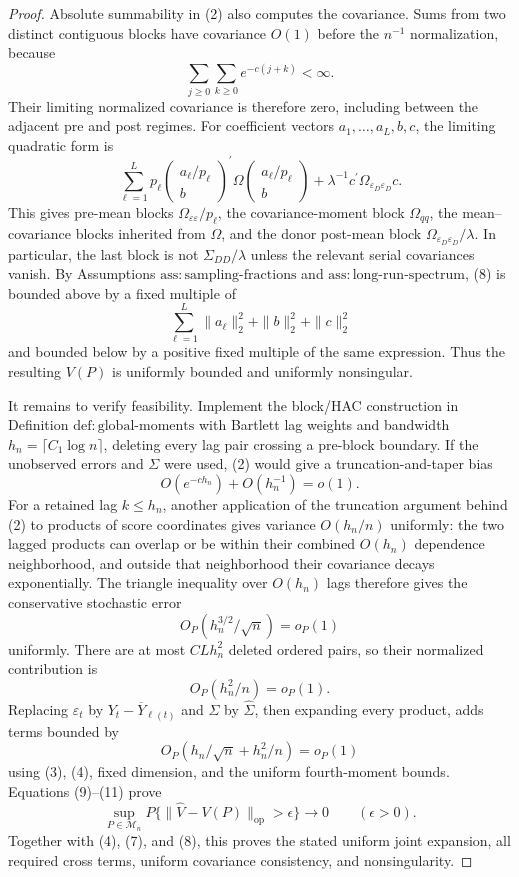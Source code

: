 \documentclass{article}
\begin{document}
\begin{proof}
Absolute summability in (2) also computes the covariance.  Sums from two distinct contiguous blocks have covariance \(O(1)\) before the \(n^{-1}\) normalization, because
\[
\sum_{j\geq0}\sum_{k\geq0}e^{-c(j+k)}<\infty.
\]
Their limiting normalized covariance is therefore zero, including between the adjacent pre and post regimes.  For coefficient vectors \(a_1,\ldots,a_L,b,c\), the limiting quadratic form is
\[
\sum_{\ell=1}^{L}p_\ell
\begin{pmatrix}a_\ell/p_\ell\\ b\end{pmatrix}^{\!\prime}
\Omega
\begin{pmatrix}a_\ell/p_\ell\\ b\end{pmatrix}
+\lambda^{-1}c^{\prime}
\Omega_{\varepsilon_D\varepsilon_D}c.
\tag{8}
\]
This gives pre-mean blocks \(\Omega_{\varepsilon\varepsilon}/p_\ell\), the covariance-moment block \(\Omega_{qq}\), the mean--covariance blocks inherited from \(\Omega\), and the donor post-mean block \(\Omega_{\varepsilon_D\varepsilon_D}/\lambda\).  In particular, the last block is not \(\Sigma_{DD}/\lambda\) unless the relevant serial covariances vanish.  By Assumptions \(\mathrm{ass:sampling\mbox{-}fractions}\) and \(\mathrm{ass:long\mbox{-}run\mbox{-}spectrum}\), (8) is bounded above by a fixed multiple of
\[
\sum_{\ell=1}^{L}\|a_\ell\|_2^2+\|b\|_2^2+\|c\|_2^2
\]
and bounded below by a positive fixed multiple of the same expression.  Thus the resulting \(V(P)\) is uniformly bounded and uniformly nonsingular.

It remains to verify feasibility.  Implement the block/HAC construction in Definition \(\mathrm{def:global\mbox{-}moments}\) with Bartlett lag weights and bandwidth \(h_n=\lceil C_1\log n\rceil\), deleting every lag pair crossing a pre-block boundary.  If the unobserved errors and \(\Sigma\) were used, (2) would give a truncation-and-taper bias
\[
O(e^{-ch_n})+O(h_n^{-1})=o(1).
\]
For a retained lag \(k\leq h_n\), another application of the truncation argument behind (2) to products of score coordinates gives variance \(O(h_n/n)\) uniformly: the two lagged products can overlap or be within their combined \(O(h_n)\) dependence neighborhood, and outside that neighborhood their covariance decays exponentially.  The triangle inequality over \(O(h_n)\) lags therefore gives the conservative stochastic error
\[
O_P(h_n^{3/2}/\sqrt n)=o_P(1)
\tag{9}
\]
uniformly.  There are at most \(C Lh_n^2\) deleted ordered pairs, so their normalized contribution is
\[
O_P(h_n^2/n)=o_P(1).
\tag{10}
\]
Replacing \(\varepsilon_t\) by \(Y_t-\overline Y_{\ell(t)}\) and \(\Sigma\) by \(\widehat\Sigma\), then expanding every product, adds terms bounded by
\[
O_P(h_n/\sqrt n+h_n^2/n)=o_P(1)
\tag{11}
\]
using (3), (4), fixed dimension, and the uniform fourth-moment bounds.  Equations (9)--(11) prove
\[
\sup_{P\in\mathcal M_n}
P\{\|\widehat V-V(P)\|_{\mathrm{op}}>\epsilon\}
\longrightarrow0
\qquad(\epsilon>0).
\]
Together with (4), (7), and (8), this proves the stated uniform joint expansion, all required cross terms, uniform covariance consistency, and nonsingularity.
\end{proof}
\end{document}
